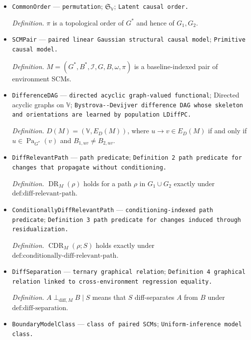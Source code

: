 \documentclass{article}
\begin{document}
\begin{itemize}
  \par\smallskip\noindent\emph{Definition.} \(\mathcal I=(\mathcal I_1,\mathcal I_2)\), where \(\mathcal I_e\) lists targeted vertices.
  \item \texttt{CommonOrder} --- \texttt{permutation}; \(\mathfrak S_{\mathbb V}\); \texttt{Latent causal order.}
  \par\smallskip\noindent\emph{Definition.} \(\pi\) is a topological order of \(G^*\) and hence of \(G_1,G_2\).
  \item \texttt{SCMPair} --- \texttt{paired linear Gaussian structural causal model}; \texttt{Primitive causal model.}
  \par\smallskip\noindent\emph{Definition.} \(M=(G^*,B^*,\mathcal I,G,B,\omega,\pi)\) is a baseline-indexed pair of environment SCMs.
  \item \texttt{DifferenceDAG} --- \texttt{directed acyclic graph-\allowbreak{}valued functional}; Directed acyclic graphs on \(\mathbb V\); \texttt{Bystrova-\allowbreak{}-\allowbreak{}Devijver difference DAG whose skeleton and orientations are learned by population LDiffPC.}
  \par\smallskip\noindent\emph{Definition.} \(D(M)=(\mathbb V,E_D(M))\), where \(u\to v\in E_D(M)\) if and only if \(u\in\operatorname{Pa}_{G^*}(v)\) and \(B_{1,uv}\neq B_{2,uv}\).
  \item \texttt{DiffRelevantPath} --- \texttt{path predicate}; \texttt{Definition 2 path predicate for changes that propagate without conditioning.}
  \par\smallskip\noindent\emph{Definition.} \(\operatorname{DR}_M(\rho)\) holds for a path \(\rho\) in \(G_1\cup G_2\) exactly under \(\text{def:diff-relevant-path}\).
  \item \texttt{ConditionallyDiffRelevantPath} --- \texttt{conditioning-\allowbreak{}indexed path predicate}; \texttt{Definition 3 path predicate for changes induced through residualization.}
  \par\smallskip\noindent\emph{Definition.} \(\operatorname{CDR}_M(\rho;S)\) holds exactly under \(\text{def:conditionally-diff-relevant-path}\).
  \item \texttt{DiffSeparation} --- \texttt{ternary graphical relation}; \texttt{Definition 4 graphical relation linked to cross-\allowbreak{}environment regression equality.}
  \par\smallskip\noindent\emph{Definition.} \(A\perp_{\mathrm{diff},M}B\mid S\) means that \(S\) diff-separates \(A\) from \(B\) under \(\text{def:diff-separation}\).
  \item \texttt{BoundaryModelClass} --- \texttt{class of paired SCMs}; \texttt{Uniform-\allowbreak{}inference model class.}

\end{itemize}
\end{document}
